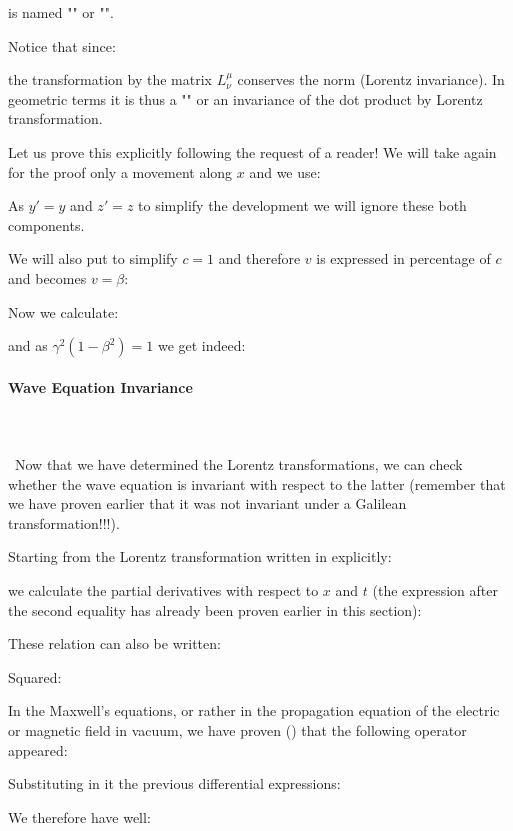 	is named "" or "".
	
	Notice that since:
	
	the transformation by the matrix $L_\nu^\mu$ conserves the norm (Lorentz invariance\label{lorentz invariance}). In geometric terms it is thus a "" or an invariance of the dot product by Lorentz transformation.
	
	Let us prove this explicitly following the request of a reader! We will take again for the proof only a movement along $x$ and we use:
	
	As $y'=y$ and $z'=z$ to simplify the development we will ignore these both components.
	
	We will also put to simplify $c=1$ and therefore $v$ is expressed in percentage of $c$ and becomes $v=\beta$:
	
	Now we calculate:
	
	and as $\gamma^2(1-\beta^2)=1$ we get indeed:
	
	
	\paragraph{Wave Equation Invariance}\mbox{}\\\\\
	Now that we have determined the Lorentz transformations, we can check whether the wave equation is invariant with respect to the latter (remember that we have proven earlier that it was not invariant under a Galilean transformation!!!).
	
	Starting from the Lorentz transformation written in explicitly:
	
	we calculate the partial derivatives with respect to $x$ and $t$ (the expression after the second equality has already been proven earlier in this section):
	
	These relation can also be written:
	
	Squared:
	
	In the Maxwell's equations, or rather in the propagation equation of the electric or magnetic field in vacuum, we have proven () that the following operator appeared:
	
	Substituting in it the previous differential expressions:
	
	We therefore have well:
	
